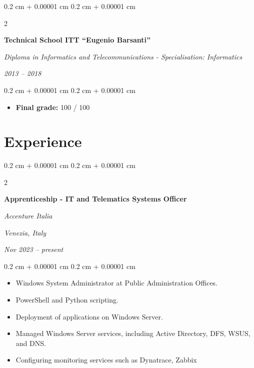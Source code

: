 \documentclass[10pt, a4paper]{article}
\newenvironment{highlights}{
    \begin{itemize}[
        topsep=0.10 cm,
        parsep=0.10 cm,
        partopsep=0pt,
        itemsep=0pt,
        leftmargin=0.4 cm + 10pt
    ]
}{
    \end{itemize}
} %
\newenvironment{onecolentry}{
    \begin{adjustwidth}{
        0.2 cm + 0.00001 cm
    }{
        0.2 cm + 0.00001 cm
    }
}{
    \end{adjustwidth}
} %
\newenvironment{twocolentry}[2][]{
    \onecolentry
    \def\secondColumn{#2}
    \setcolumnwidth{\fill, 6.5 cm}
    \begin{paracol}{2}
}{
    \switchcolumn \raggedleft \secondColumn
    \end{paracol}
    \endonecolentry
} %
\begin{document}
        \begin{twocolentry}{
            
            
        \textit{2013 – 2018}}
            \textbf{Technical School ITT “Eugenio Barsanti”}

            \textit{Diploma in Informatics and Telecommunications - Specialisation: Informatics}
        \end{twocolentry}

        \vspace{0.10 cm}
        \begin{onecolentry}
            \begin{highlights}
                \item \textbf{Final grade:} 100 / 100
            \end{highlights}
        \end{onecolentry}



    
    \section{Experience}



        
        \begin{twocolentry}{
        \textit{Venezia, Italy}    
            
        \textit{Nov 2023 – present}}
            \textbf{Apprenticeship - IT and Telematics Systems Officer}
            
            \textit{Accenture Italia}
        \end{twocolentry}

        \vspace{0.10 cm}
        \begin{onecolentry}
            \begin{highlights}
                \item Windows System Administrator at Public Administration Offices.
                \item PowerShell and Python scripting.
                \item Deployment of applications on Windows Server.
                \item Managed Windows Server services, including Active Directory, DFS, WSUS, and DNS.
                \item Configuring monitoring services such as Dynatrace, Zabbix
            \end{highlights}
        \end{onecolentry}
\end{document}
